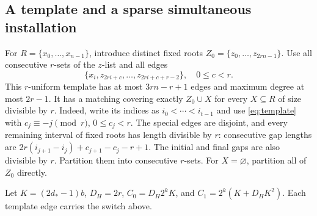 \documentclass[12pt,letterpaper,onecolumn]{article}
\theoremstyle{definition}
\begin{document}
\subsection{A template and a sparse simultaneous installation}
For $R=\{x_0,\ldots,x_{n-1}\}$, introduce distinct fixed roots $Z_0=\{z_0,\ldots,z_{2rn-1}\}$. Use all consecutive $r$-sets of the $z$-list and all edges
\begin{equation}
 \{x_i,z_{2ri+c},\ldots,z_{2ri+c+r-2}\},\quad0\le c<r.
 \label{eq:template}
\end{equation}
This $r$-uniform template has at most $3rn-r+1$ edges and maximum degree at most $2r-1$. It has a matching covering exactly $Z_0\cup X$ for every $X\subseteq R$ of size divisible by $r$. Indeed, write its indices as $i_0<\cdots<i_{t-1}$ and use \eqref{eq:template} with $c_j\equiv-j\pmod r$, $0\le c_j<r$. The special edges are disjoint, and every remaining interval of fixed roots has length divisible by $r$: consecutive gap lengths are $2r(i_{j+1}-i_j)+c_{j+1}-c_j-r+1$. The initial and final gaps are also divisible by $r$. Partition them into consecutive $r$-sets. For $X=\varnothing$, partition all of $Z_0$ directly.

Let $K=(2d_*-1)b$, $D_H=2r$, $C_0=D_H2^kK$, and $C_1=2^k(K+D_HK^2)$. Each template edge carries the switch above.
\end{document}
